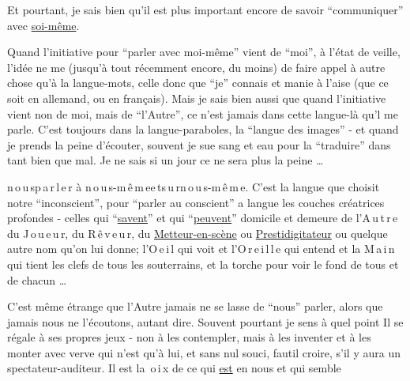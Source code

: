 Et pourtant, je sais bien qu'il est plus important encore de savoir ``communiquer'' avec \uline{soi-même}.

Quand l'initiative pour ``parler avec moi-même'' vient de ``moi'', à l'état de veille, l'idée ne me   (jusqu'à tout récemment encore, du moins) de faire appel à autre chose qu'à la langue-mots, celle donc que ``je'' connais et manie à l'aise (que ce soit en allemand, ou en français). Mais je sais bien aussi que quand l'initiative vient non de moi, mais de ``l'Autre'', ce n'est jamais  dans cette langue-là qu'l me parle. C'est toujours dans la langue-paraboles, la ``langue des images'' - et quand je prends la peine d'écouter, souvent je sue sang et eau pour la ``traduire'' dans  tant bien que mal. Je ne sais si un jour ce ne sera plus la peine \ldots

  \mbox{n\,o\,u\,s}\quad\mbox{p\,a\,r\,l\,e\,r} à \mbox{n\,o\,u\,s-m\,ê\,m\,e}\quad\mbox{e\,t}\quad\mbox{s\,u\,r}\quad\mbox{n\,o\,u\,s-m\,ê\,m\,e}. C'est la langue  que choisit notre ``inconscient'', pour ``parler au conscient'' a langue  les couches créatrices profondes - celles qui ``\uline{savent}'' et qui ``\uline{peuvent}''\handwritten{,}\deleted{\unsure{;}} domicile et demeure de l'\mbox{A\,u\,t\,r\,e}\deleted{\unsure{(}} \handwritten{,} du \mbox{J\,o\,u\,e\,u\,r}, du \mbox{R\,ê\,v\,e\,u\,r}, du  \uline{Metteur-en-scène} ou \uline{Prestidigitateur} ou quelque autre nom qu'on lui donne; l'\mbox{O\,e\,i\,l} qui voit et l'\mbox{O\,r\,e\,i\,l\,l\,e} qui entend et la \mbox{M\,a\,i\,n} qui tient les clefs de tous les  souterrains, et la torche  pour  voir le fond de tous et de chacun \ldots

C'est même étrange que l'Autre jamais ne se lasse de ``nous'' parler, alors que jamais nous ne l'écoutons, autant dire. Souvent pourtant je sens  à quel point Il se régale à ses propres jeux - non  à les contempler, mais à les inventer et à les monter  avec  verve  qui n'est qu'à lui, et sans nul souci, faut\handwritten{-}il croire, s'il y aura un spectateur-auditeur. Il est la \mbox{\,o\,i\,x} de ce qui \uline{est} en nous et qui semble

